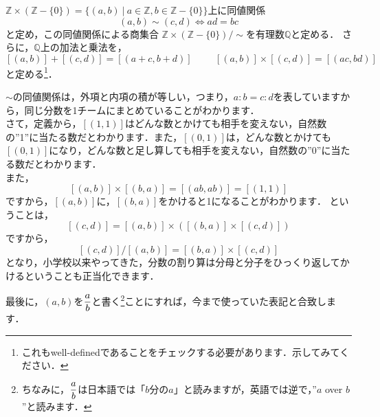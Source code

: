 \begin{defi}[有理数]
$\mathbb{Z}\times(\mathbb{Z}-\{0\})=\{(a,b)\ |\
 a\in\mathbb{Z},b\in\mathbb{Z}-\{0\}\}$上に同値関係
 \[
  (a,b)\sim(c,d)\Leftrightarrow ad=bc
 \]
 と定め，この同値関係による商集合
 $\mathbb{Z}\times(\mathbb{Z}-\{0\})/\sim$を有理数$\mathbb{Q}$と定める．
 さらに，$\mathbb{Q}$上の加法と乗法を，
 \[
  [(a,b)]+[(c,d)]=[(a+c,b+d)]\hspace{1cm}[(a,b)]\times[(c,d)]=[(ac,bd)]
 \]
 と定める\footnote{これもwell-definedであることをチェックする必要があります．示してみてください．}．
\end{defi}

$\sim$の同値関係は，外項と内項の積が等しい，つまり，$a:b=c:d$を表していますから，同じ分数を1チームにまとめていることがわかります．\\
さて，定義から，$[(1,1)]$はどんな数とかけても相手を変えない，自然数の''1''に当たる数だとわかります．また，$[(0,1)]$は，どんな数とかけても$[(0,1)]$になり，どんな数と足し算しても相手を変えない，自然数の''0''に当たる数だとわかります．\\
また，
\[
 [(a,b)]\times[(b,a)]=[(ab,ab)]=[(1,1)]
\]
ですから，$[(a,b)]$に，$[(b,a)]$をかけると1になることがわかります．
ということは，
\[
 [(c,d)]=[(a,b)]\times([(b,a)]\times[(c,d)])
\]
ですから，
\[
 [(c,d)]/[(a,b)]=[(b,a)]\times[(c,d)]
\]
となり，小学校以来やってきた，分数の割り算は分母と分子をひっくり返してかけるということも正当化できます．

最後に，$(a,b)$を$\displaystyle\frac{a}{b}$と書く\footnote{ちなみに，$\displaystyle\frac{a}{b}$は日本語では「$b$分の$a$」と読みますが，英語では逆で，''$a$ over $b$''と読みます．}ことにすれば，今まで使っていた表記と合致します．


